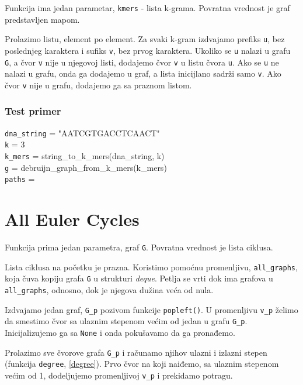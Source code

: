 Funkcija ima jedan parametar, \texttt{kmers} - lista k-grama. Povratna vrednost je graf predstavljen mapom. 

Prolazimo listu, element po element. Za svaki k-gram izdvajamo prefiks \texttt{u}, bez poslednjeg karaktera i sufiks \texttt{v}, bez prvog karaktera. Ukoliko se \texttt{u} nalazi u grafu \texttt{G}, a čvor \texttt{v} nije u njegovoj listi, dodajemo čvor \texttt{v} u listu čvora \texttt{u}. Ako se \texttt{u} ne nalazi u grafu, onda ga dodajemo u graf, a lista inicijlano sadrži samo \texttt{v}. Ako čvor \texttt{v} nije u grafu, dodajemo ga sa praznom listom.






\subsubsection{Test primer}

\noindent \texttt{dna\_string} = "AATCGTGACCTCAACT"
\\\texttt{k} = 3                   
\\\texttt{k\_mers} = string\_to\_k\_mers(dna\_string, k)
\\\texttt{g} = debruijn\_graph\_from\_k\_mers(k\_mers)
\\\texttt{paths} = 


\section{All Euler Cycles}

Funkcija prima jedan parametra, graf \texttt{G}. Povratna vrednost je lista ciklusa.

Lista ciklusa na početku je prazna. Koristimo pomoćnu promenljivu, \texttt{all\_graphs}, koja čuva kopiju grafa \texttt{G} u strukturi \textit{deque}. Petlja se vrti dok ima grafova u \texttt{all\_graphs}, odnosno, dok je njegova dužina veća od nula. 

Izdvajamo jedan graf, \texttt{G\_p} pozivom funkcije \texttt{popleft()}. U promenljivu \texttt{v\_p} želimo da smestimo čvor sa ulaznim stepenom većim od jedan u grafu \texttt{G\_p}. Inicijalizujemo ga sa \texttt{None} i onda pokušavamo da ga pronađemo.

Prolazimo sve čvorove grafa \texttt{G\_p} i računamo njihov ulazni i izlazni stepen (funkcija \texttt{degree}, \ref{degree}). Prvo čvor na koji naiđemo, sa ulaznim stepenom većim od 1, dodeljujemo promenljivoj \texttt{v\_p} i prekidamo potragu.

